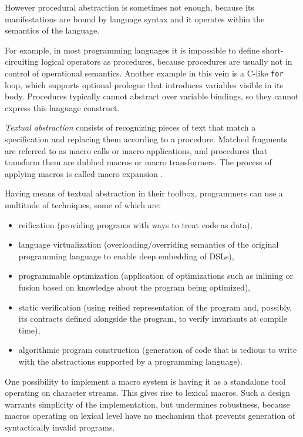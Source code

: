 \documentclass[10pt,journal,a4paper]{IEEEtran}
\begin{document}
However procedural abstraction is sometimes not enough, because
its manifestations are bound by language syntax and it operates within the semantics
of the language.

For example, in most programming languages it is impossible to define short-circuiting logical operators
as procedures, because procedures are usually not in control of operational semantics.
Another example in this vein is a C-like \texttt{for} loop, which supports
optional prologue that introduces variables visible in its body. Procedures typically cannot abstract
over variable bindings, so they cannot express this language construct.


\emph{Textual abstraction} consists of recognizing pieces of text
that match a specification and replacing them according
to a procedure.
Matched fragments are referred to as macro calls or macro applications, and
procedures that transform them are dubbed macros or macro transformers.
The process of applying macros is called macro expansion \cite{kohlbecker86}.

Having means of textual abstraction in their toolbox, programmers can use a multitude of techniques,
some of which are:
\begin{itemize}
\item reification (providing programs with ways to treat code as data),
\item language virtualization (overloading/overriding semantics of the original programming language
to enable deep embedding of DSLs),
\item programmable optimization (application of optimizations such as inlining
or fusion based on knowledge about the program being optimized),
\item static verification (using reified representation of the program
and, possibly, its contracts defined alongside the program, to verify invariants
at compile time),
\item algorithmic program construction (generation of code that is tedious to write with
the abstractions supported by a programming language).
\end{itemize}

One possibility to implement a macro system is having it as a standalone tool
operating on character streams. This gives rise to lexical macros.
Such a design warrants simplicity of the implementation,
but undermines robustness, because macros operating on lexical level
have no mechanism that prevents generation of syntactically invalid programs.
\end{document}
